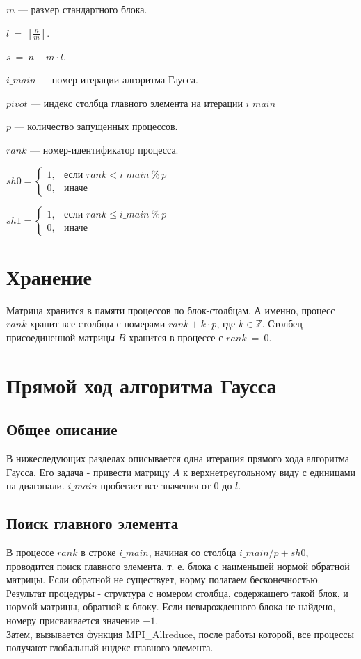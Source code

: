 \documentclass[11pt]{article}
\begin{document}
$m$ --- размер стандартного блока.

$l\ =\ \displaystyle{\left[\frac{n}{m}\right]}$.

$s\ =\ n - m\cdot l$.

$i\_main$ --- номер итерации алгоритма Гаусса.

$pivot$ --- индекс столбца главного элемента на итерации $i\_main$

$p$ --- количество запущенных процессов.

$rank$ --- номер-идентификатор процесса.

$
sh0 = \begin{cases} 1, &\text{если } rank < i\_main\ \%\ p\\
0, & \text{иначе} \end{cases}
$

$
sh1 = \begin{cases} 1, &\text{если } rank \leqslant i\_main\ \%\ p\\
0, & \text{иначе} \end{cases}
$


\section{Хранение}
\enlargethispage{4\baselineskip}
Матрица хранится в памяти процессов по блок-столбцам. А именно, процесс $rank$ хранит все столбцы с номерами $rank + k\cdot p$, где $k \in \mathbb{Z}$. Столбец присоединенной матрицы $B$ хранится в процессе с $rank\ =\ 0$.

\section{Прямой ход алгоритма Гаусса}
\subsection{Общее описание}
В нижеследующих разделах описывается одна итерация прямого хода алгоритма Гаусса. Его задача - привести матрицу $A$ к верхнетреугольному виду с единицами на диагонали. $i\_main$ пробегает все значения от $0$ до $l$.
\subsection{Поиск главного элемента}
В процессе $rank$ в строке $i\_main$, начиная со столбца $i\_main / p + sh0$, проводится поиск главного элемента. т. е. блока с наименьшей нормой обратной матрицы. Если обратной не существует, норму полагаем бесконечностью.
Результат процедуры - структура с номером столбца, содержащего такой блок, и нормой матрицы, обратной к блоку. Если невырожденного блока не найдено, номеру присваивается значение $-1$.
\\
Затем, вызывается функция MPI\_Allreduce\label{itm:allreduce}, после работы которой, все процессы получают глобальный индекс главного элемента.
\end{document}
